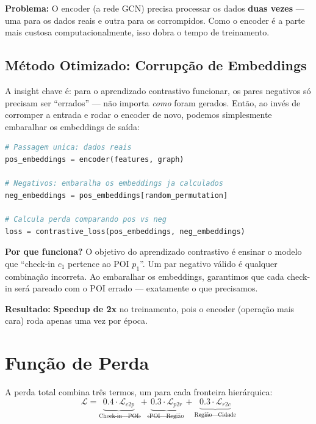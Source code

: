 \documentclass[a4paper,11pt]{article}
\begin{document}
\textbf{Problema:} O encoder (a rede GCN) precisa processar os dados \textbf{duas vezes} --- uma para os dados reais e outra para os corrompidos. Como o encoder é a parte mais custosa computacionalmente, isso dobra o tempo de treinamento.

\subsection{Método Otimizado: Corrupção de Embeddings}

A insight chave é: para o aprendizado contrastivo funcionar, os pares negativos só precisam ser ``errados'' --- não importa \textit{como} foram gerados. Então, ao invés de corromper a entrada e rodar o encoder de novo, podemos simplesmente embaralhar os embeddings de saída:

\begin{lstlisting}[language=Python, title={\textbf{Método Otimizado (1 passagem pelo encoder)}}]
# Passagem unica: dados reais
pos_embeddings = encoder(features, graph)

# Negativos: embaralha os embeddings ja calculados
neg_embeddings = pos_embeddings[random_permutation]

# Calcula perda comparando pos vs neg
loss = contrastive_loss(pos_embeddings, neg_embeddings)
\end{lstlisting}

\textbf{Por que funciona?} O objetivo do aprendizado contrastivo é ensinar o modelo que ``check-in $c_1$ pertence ao POI $p_1$''. Um par negativo válido é qualquer combinação incorreta. Ao embaralhar os embeddings, garantimos que cada check-in será pareado com o POI errado --- exatamente o que precisamos.

\textbf{Resultado:} \colorbox{yellow!30}{\textbf{Speedup de 2x}} no treinamento, pois o encoder (operação mais cara) roda apenas uma vez por época.

\section{Função de Perda}

A perda total combina três termos, um para cada fronteira hierárquica:
\begin{equation*}
\mathcal{L} = \underbrace{0.4 \cdot \mathcal{L}_{c2p}}_{\text{Check-in}\leftrightarrow\text{POI}} + \underbrace{0.3 \cdot \mathcal{L}_{p2r}}_{\text{POI}\leftrightarrow\text{Região}} + \underbrace{0.3 \cdot \mathcal{L}_{r2c}}_{\text{Região}\leftrightarrow\text{Cidade}}
\end{equation*}
\end{document}
